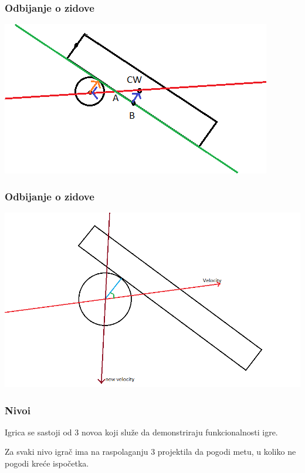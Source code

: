 \documentclass{beamer}
\begin{document}
\begin{frame}
	\frametitle{Odbijanje o zidove}
	
	\includegraphics[scale=0.67]{./images/odbijanje2.png}
\end{frame}

\begin{frame}
	\frametitle{Odbijanje o zidove}
	
	\includegraphics[scale=0.34]{./images/odbijanje1.png}
\end{frame}

\begin{frame}
	\frametitle{Nivoi}
	\Large
	Igrica se sastoji od 3 novoa koji služe da demonstriraju funkcionalnosti igre.
	
	Za svaki nivo igrač ima na raspolaganju 3 projektila da pogodi metu, u koliko ne pogodi kreće ispočetka.
\end{frame}
\end{document}

